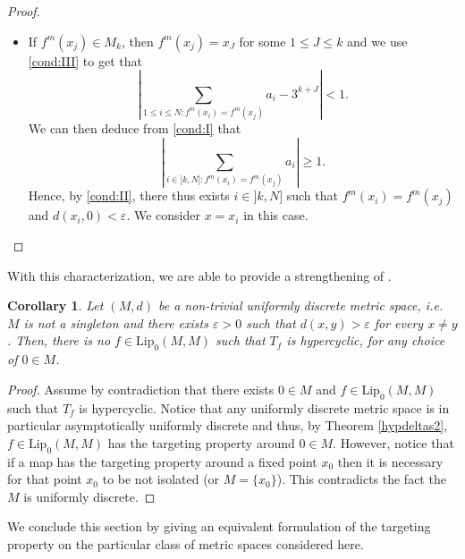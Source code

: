 \documentclass[12pt,english]{amsart}
\numberwithin{equation}{section}
\theoremstyle{plain}
\newtheorem{corollary}[theorem]{Corollary}
\theoremstyle{definition}
\def\lip{ \text{Lip}}
\begin{document}
\begin{proof}
\begin{itemize}
\item If $f^m(x_j)\in M_k$, then $f^m(x_j)=x_J$ for some $1\le J\le k$ and we use \eqref{cond:III} to get that 
\[\left|\sum_{1\le i\le N:f^m(x_i)=f^m(x_j)}a_i-3^{k+J}\right|<1.\]
We can then deduce from \eqref{cond:I} that
\[\left|\sum_{i\in ]k,N]:f^m(x_i)=f^m(x_j)}a_i\right|\ge 1.\]
Hence, by \eqref{cond:II}, there thus exists $i\in ]k,N]$ such that $f^m(x_i)=f^m(x_j)$ and $d(x_i,0)<\varepsilon$. We consider $x=x_i$ in this case.
\end{itemize}
\end{proof}

With this characterization, we are able to provide a strengthening of \cite[Remark 1.3]{ACP21}.

\begin{corollary}\label{cor:ud-no-HC}
Let $(M,d)$ be a non-trivial uniformly discrete metric space, i.e. $M$ is not a singleton and there exists $\varepsilon>0$ such that $d(x,y) > \varepsilon$ for
every $x\ne y$. Then, there is no $f\in\lip_0(M,M)$ such that $T_f$ is hypercyclic, for any choice of $0\in M$.

\end{corollary}
\begin{proof}
Assume by contradiction that there exists $0\in M$ and $f\in \lip_0(M,M)$ such that $T_f$ is hypercyclic. Notice that any uniformly discrete metric space is in particular asymptotically uniformly discrete and thus, by Theorem \ref{hypdeltas2}, $f\in\lip_0(M,M)$ has the targeting property around $0\in M$. However, notice that if a map has the targeting property around a fixed point $x_0$ then it is necessary for that point $x_0$ to be not isolated (or $M=\{x_0\}$). This contradicts the fact the $M$ is uniformly discrete.
\end{proof}

We conclude this section by giving an equivalent formulation of the targeting property on the particular class of metric spaces considered here.
\end{document}
